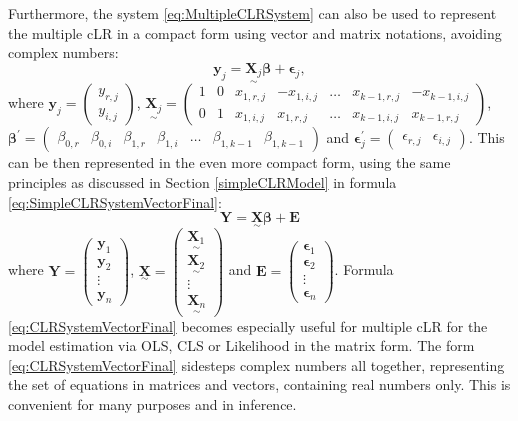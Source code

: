 \documentclass[
]{book}
\begin{document}
Furthermore, the system \eqref{eq:MultipleCLRSystem} can also be used to represent the multiple cLR in a compact form using vector and matrix notations, avoiding complex numbers:
\begin{equation}
    \mathbf{y}_j = \underset{\sim}{\mathbf{X}_j} \boldsymbol{\beta} + \boldsymbol{\epsilon}_j ,
    \label{eq:MultipleCLRSystemVector}
\end{equation}
where \(\mathbf{y}_j = \begin{pmatrix} y_{r,j} \\ y_{i,j} \end{pmatrix}\), \(\underset{\sim}{\mathbf{X}_j} = \begin{pmatrix} 1 & 0 & x_{1,r,j} & -x_{1,i,j} & \dots & x_{k-1,r,j} & -x_{k-1,i,j} \\ 0 & 1 & x_{1,i,j} & x_{1,r,j} & \dots & x_{k-1,i,j} & x_{k-1,r,j} \end{pmatrix}\), \(\boldsymbol{\beta}^\prime = \begin{pmatrix} \beta_{0,r} & \beta_{0,i} & \beta_{1,r} & \beta_{1,i} & \dots & \beta_{1,k-1} & \beta_{1,k-1} \end{pmatrix}\) and \(\mathbf{\epsilon}_j^\prime = \begin{pmatrix} \epsilon_{r,j} & \epsilon_{i,j} \end{pmatrix}\). This can be then represented in the even more compact form, using the same principles as discussed in Section \ref{simpleCLRModel} in formula \eqref{eq:SimpleCLRSystemVectorFinal}:
\begin{equation}
    \mathbf{Y} = \underset{\sim}{\mathbf{X}} \boldsymbol{\beta} + \mathbf{E} 
    \label{eq:CLRSystemVectorFinal}
\end{equation}
where \(\mathbf{Y}=\begin{pmatrix}\mathbf{y}_1 \\ \mathbf{y}_2\\ \vdots \\ \mathbf{y}_n \end{pmatrix}\), \(\underset{\sim}{\mathbf{X}}=\begin{pmatrix} \underset{\sim}{\mathbf{X}_1} \\ \underset{\sim}{\mathbf{X}_2} \\ \vdots \\ \underset{\sim}{\mathbf{X}_n} \end{pmatrix}\) and \(\mathbf{E}=\begin{pmatrix}\boldsymbol{\epsilon}_1 \\ \boldsymbol{\epsilon}_2\\ \vdots \\ \boldsymbol{\epsilon}_n \end{pmatrix}\). Formula \eqref{eq:CLRSystemVectorFinal} becomes especially useful for multiple cLR for the model estimation via OLS, CLS or Likelihood in the matrix form. The form \eqref{eq:CLRSystemVectorFinal} sidesteps complex numbers all together, representing the set of equations in matrices and vectors, containing real numbers only. This is convenient for many purposes and in inference.
\end{document}
